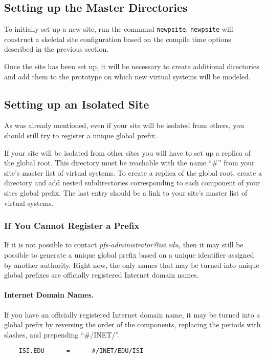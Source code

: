 \subsection{Setting up the Master Directories}

To initially set up a new site, run the command {\tt newpsite}.  
{\tt newpsite} will construct a skeletal site configuration based on the
compile time options described in the previous section.

Once the site has been set up, it will be necessary to create
additional directories and add them to the prototype on which new
virtual systems will be modeled.

\subsection{Setting up an Isolated Site\label{isolated}}

As was already mentioned, even if your site will be isolated from
others, you should still try to register a unique global prefix.  

If your site will be isolated from other sites you will have to set up
a replica of the global root.  This directory must be reachable with
the name ``\#'' from your site's master list of virtual systems.  To
create a replica of the global root, create a directory and add nested
subdirectories corresponding to each component of your sites global
prefix. The last entry should be a link to your site's master list of
virtual systems.

\subsubsection{If You Cannot Register a Prefix\label{no_prefix}}

If it is not possible to contact {\it
pfs-administrator@isi.edu,} then it may still be possible to
generate a unique global prefix based on a unique identifier assigned
by another authority.  Right now, the only names that may be turned
into unique global prefixes are officially registered Internet domain
names.

\paragraph{Internet Domain Names.}   If you have an officially
registered Internet domain name, it may be turned into a global prefix
by reversing the order of the components, replacing the periods with
slashes, and prepending ``\#/INET/''.
\begin{verbatim}
    ISI.EDU      =      #/INET/EDU/ISI
\end{verbatim}

